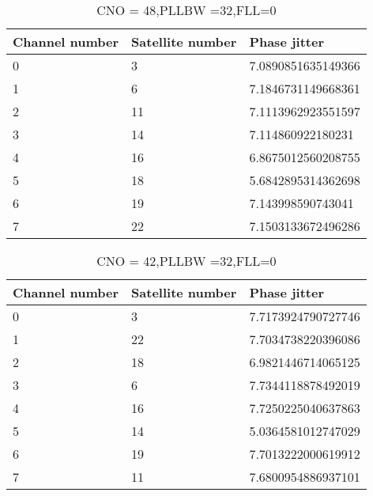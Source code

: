 \begin{table}[!htb]
\centering
\begin{tabular}{|l|l|l|}
\hline
\rowcolor[HTML]{C0C0C0} 
Channel number & Satellite number & Phase jitter       \\ \hline
0              & 3                & 7.0890851635149366 \\ \hline
\rowcolor[HTML]{EFEFEF} 
1              & 6                & 7.1846731149668361 \\ \hline
2              & 11               & 7.1113962923551597 \\ \hline
\rowcolor[HTML]{EFEFEF} 
3              & 14               & 7.114860922180231  \\ \hline
4              & 16               & 6.8675012560208755 \\ \hline
\rowcolor[HTML]{EFEFEF} 
5              & 18               & 5.6842895314362698 \\ \hline
6              & 19               & 7.143998590743041  \\ \hline
\rowcolor[HTML]{EFEFEF} 
7              & 22               & 7.1503133672496286 \\ \hline
\end{tabular}
\caption{CNO = 48,PLLBW =32,FLL=0}
\label{my-label}
\end{table}


\begin{table}[!htb]
\centering
\begin{tabular}{|l|l|l|}
\hline
\rowcolor[HTML]{C0C0C0} 
Channel number & Satellite number & Phase jitter       \\ \hline
0              & 3                & 7.7173924790727746 \\ \hline
\rowcolor[HTML]{EFEFEF} 
1              & 22               & 7.7034738220396086 \\ \hline
2              & 18               & 6.9821446714065125 \\ \hline
\rowcolor[HTML]{EFEFEF} 
3              & 6                & 7.7344118878492019 \\ \hline
4              & 16               & 7.7250225040637863 \\ \hline
\rowcolor[HTML]{EFEFEF} 
5              & 14               & 5.0364581012747029 \\ \hline
6              & 19               & 7.7013222000619912 \\ \hline
\rowcolor[HTML]{EFEFEF} 
7              & 11               & 7.6800954886937101 \\ \hline
\end{tabular}
\caption{CNO = 42,PLLBW =32,FLL=0}
\label{my-label}
\end{table}


